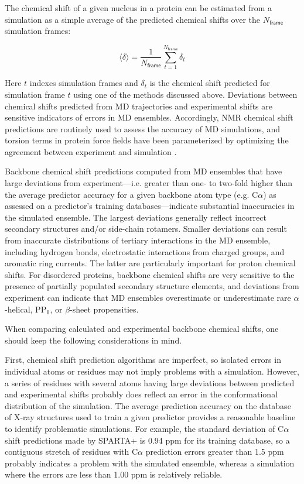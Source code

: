 \documentclass[9pt,review]{livecoms}
\begin{document}
The chemical shift of a given nucleus in a protein can be estimated from a simulation as a simple average of the predicted chemical shifts over the $N_{\mathsf{frame}}$ simulation frames: 

\begin{equation}
\label{eqn:shift_estimate}
\langle \delta \rangle = \frac {1} {N_\mathsf{frame}} \sum_{t=1}^{N_{\mathsf{frame}}} \delta_t
\end{equation}

\noindent Here $t$ indexes simulation frames and $\delta_t$ is the chemical shift predicted for simulation frame $t$ using one of the methods discussed above.
Deviations between chemical shifts predicted from MD trajectories and experimental shifts are sensitive indicators of errors in MD ensembles.
Accordingly, NMR chemical shift predictions are routinely used to assess the accuracy of MD simulations, and torsion terms in protein force fields have been parameterized by optimizing the agreement between experiment and simulation \cite{li_nmr-based_2010,robustelli_developing_2018}.

Backbone chemical shift predictions computed from MD ensembles that have large deviations from experiment---i.e. greater than one- to two-fold higher than the average predictor accuracy for a given backbone atom type (e.g. C$\alpha$) as assessed on a predictor’s training databases---indicate substantial inaccuracies in the simulated ensemble.
The largest deviations generally reflect incorrect secondary structures and/or side-chain rotamers.
Smaller deviations can result from inaccurate distributions of tertiary interactions in the MD ensemble, including hydrogen bonds, electrostatic interactions from charged groups, and aromatic ring currents.
The latter are particularly important for proton chemical shifts.
For disordered proteins, backbone chemical shifts are very sensitive to the presence of partially populated secondary structure elements, and deviations from experiment can indicate that MD ensembles overestimate or underestimate rare $\alpha$-helical, PP$_\mathsf{II}$, or $\beta$-sheet propensities.

When comparing calculated and experimental backbone chemical shifts, one should keep the following considerations in mind.

First, chemical shift prediction algorithms are imperfect, so isolated errors in individual atoms or residues may not imply problems with a simulation.
However, a series of residues with several atoms having large deviations between predicted and experimental shifts probably does reflect an error in the conformational distribution of the simulation.
The average prediction accuracy on the database of X-ray structures used to train a given predictor provides a reasonable baseline to identify problematic simulations.
For example, the standard deviation of C$\alpha$ shift predictions made by SPARTA+ is 0.94 ppm for its training database, so a contiguous stretch of residues with C$\alpha$ prediction errors greater than 1.5 ppm probably indicates a problem with the simulated ensemble, whereas a simulation where the errors are less than 1.00 ppm is relatively reliable.
\end{document}
